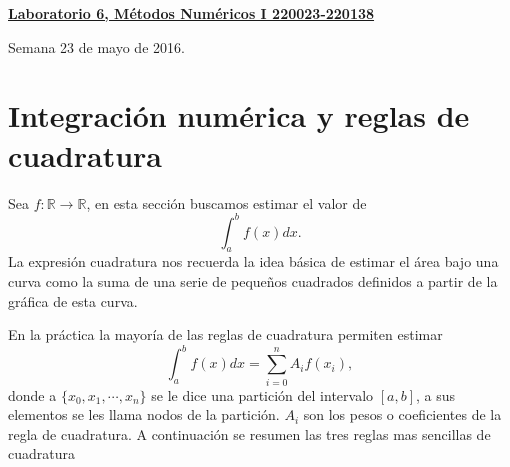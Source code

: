 \documentclass[11pt]{article}
\begin{document}
\hspace*{-1,5cm}


\vspace*{0.5cm} \centerline {\bf\underline{Laboratorio 6, M\'etodos Num\'ericos I 220023-220138}}
\centerline{\textrm{Semana 23 de mayo de 2016.}}  \vspace{0.2cm}




\section{Integraci\'on num\'erica y reglas de cuadratura}

Sea $f:\mathbb{R}\longrightarrow \mathbb{R}$, en esta secci\'on buscamos estimar el valor de 
$$
\int_{a}^b f(x)dx.
$$
La expresi\'on cuadratura nos recuerda la idea b\'asica de estimar el \'area bajo una curva como la suma 
de una serie de pequeños cuadrados definidos a partir de la gr\'afica de esta curva. 

En la pr\'actica la mayor\'ia de las reglas de cuadratura permiten estimar
$$
\displaystyle
\int_{a}^b f(x)dx= \sum_{i=0}^n A_if(x_i),
$$
donde a $\{x_0,x_1,\cdots,x_n\}$ se le dice una partici\'on del intervalo $[a,b]$, a sus elementos se les llama nodos de la partici\'on. $A_i$ son los pesos o coeficientes de la regla de cuadratura. A continuaci\'on se resumen las tres reglas mas sencillas de cuadratura
\end{document}

